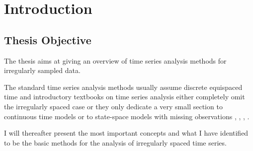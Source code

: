 \chapter{Introduction}\label{ch:introduction}


\section{Thesis Objective}\label{sec:thesis-objective}

The thesis aims at giving an overview of time series analysis methods for irregularly sampled data.

The standard time series analysis methods usually assume discrete equispaced time and introductory textbooks on
time series analysis either completely omit the irregularly spaced case or they only dedicate
a very small section to continuous time models or to state-space models
with missing observations \citeauthor{brockwell_time_1991}, \citeauthor{brockwell_introduction_2016},
\citeauthor{cryer_time_2008}, \citeauthor{chatfield_analysis_2003}.

I will thereafter present the most important concepts and what I have identified to be the basic methods for
the analysis of irregularly spaced time series.

